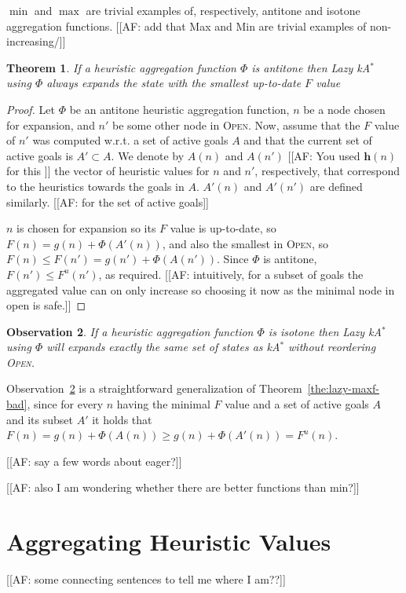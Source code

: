 \documentclass[twoside,11pt]{article}
\newtheorem{theorem}{Theorem}
\newtheorem{observation}[theorem]{Observation}
\newcommand{\kastar}{kA$^*$\xspace}
\newcommand{\open}{\textsc{Open}\xspace}
\newcommand{\vect}[1]{\mathbf{#1}}
\begin{document}
$\min$ and $\max$ are trivial examples of, respectively, antitone and isotone aggregation functions.
[[AF: add that Max and Min are trivial examples of non-increasing/]]
\begin{theorem}
  If a heuristic aggregation function $\Phi$ is antitone then Lazy \kastar using $\Phi$ always expands the state with the smallest up-to-date $F$ value
\end{theorem}
\begin{proof}
Let $\Phi$ be an antitone heuristic aggregation function, $n$ be a node chosen for expansion, and $n'$ be some other node in \open.
Now, assume that the $F$ value of $n'$ was computed w.r.t. a set of active goals $A$ and that the current set of active goals is $A'\subset A$.
We denote by $A(n)$ and $A(n')$ [[AF: You used $\vect{h}(n)$ for this ]] the vector of heuristic values for $n$ and $n'$, respectively, that correspond to the heuristics towards the goals in $A$. 
$A'(n)$ and $A'(n')$ are defined similarly. [[AF: for the set of active goals]]

$n$ is chosen for expansion so its $F$ value is up-to-date, so $F(n)=g(n)+\Phi(A'(n))$, and also the smallest in \open, so $F(n)\leq F(n')=g(n')+\Phi(A(n'))$.
Since $\Phi$ is antitone, $F(n')\leq F^u(n')$, as required.  [[AF: intuitively, for a subset of goals the aggregated value can on only increase so choosing it now as the minimal node in open is safe.]]
\end{proof}

\begin{observation}
  \label{obs:genMaxNoLazy}
  If a heuristic aggregation function $\Phi$ is isotone then Lazy \kastar using $\Phi$ will expands exactly the same set of states as \kastar without reordering \open.
\end{observation}
Observation~\ref{obs:genMaxNoLazy} is a straightforward generalization of Theorem~\ref{the:lazy-maxf-bad},
since for every $n$ having the minimal $F$ value and a set of active goals $A$ and its subset $A'$ it holds that $F(n)=g(n)+\Phi(A(n))\geq g(n)+\Phi(A'(n))=F^u(n)$. 

[[AF: say a few words about eager?]]

[[AF: also I am wondering whether there are better functions than min?]]

\section{Aggregating Heuristic Values}
[[AF: some connecting sentences to tell me where I am??]]
\end{document}
